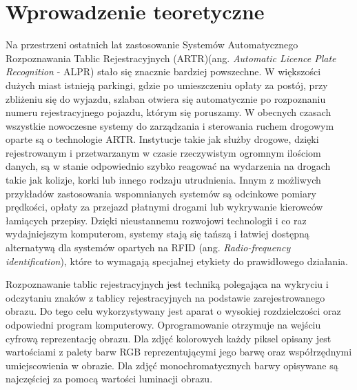%


\chapter{Wprowadzenie teoretyczne}

Na przestrzeni ostatnich lat zastosowanie Systemów Automatycznego Rozpoznawania Tablic Rejestracyjnych (ARTR)(ang. \textit{Automatic Licence Plate Recognition} - ALPR) stało się znacznie bardziej powszechne.
W większości dużych miast istnieją parkingi, gdzie po umieszczeniu opłaty za postój, przy zbliżeniu się do wyjazdu, szlaban otwiera się automatycznie po rozpoznaniu numeru rejestracyjnego pojazdu, którym się poruszamy.
W obecnych czasach wszystkie nowoczesne systemy do zarządzania i sterowania ruchem drogowym oparte są o technologie ARTR.
Instytucje takie jak służby drogowe, dzięki rejestrowanym i przetwarzanym w czasie rzeczywistym ogromnym ilościom danych, są w stanie odpowiednio szybko reagować na wydarzenia na drogach takie jak kolizje, korki lub innego rodzaju utrudnienia.
Innym z możliwych przykładów zastosowania wspomnianych systemów są odcinkowe pomiary prędkości, opłaty za przejazd płatnymi drogami lub wykrywanie kierowców łamiących przepisy.
Dzięki nieustannemu rozwojowi technologii i co raz wydajniejszym komputerom, systemy stają się tańszą i łatwiej dostępną alternatywą dla systemów opartych na RFID (ang. \textit{Radio-frequency identification}), które to wymagają specjalnej etykiety do prawidłowego działania.

Rozpoznawanie tablic rejestracyjnych jest techniką polegająca na wykryciu i odczytaniu znaków z tablicy rejestracyjnych na podstawie zarejestrowanego obrazu.
Do tego celu wykorzystywany jest aparat o wysokiej rozdzielczości oraz odpowiedni program komputerowy.
Oprogramowanie otrzymuje na wejściu cyfrową reprezentację obrazu.
Dla zdjęć kolorowych każdy piksel opisany jest wartościami z palety barw RGB reprezentującymi jego barwę oraz współrzędnymi umiejscowienia w obrazie.
Dla zdjęć monochromatycznych barwy opisywane są najczęściej za pomocą wartości luminacji obrazu.

